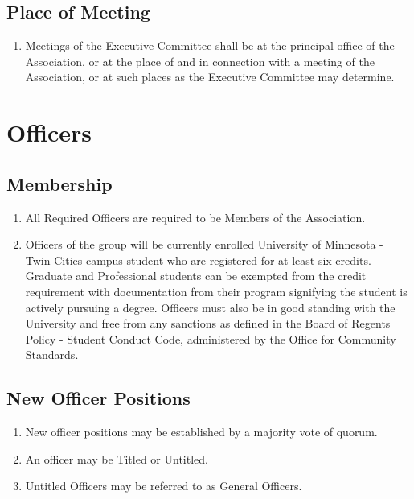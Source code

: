 \documentclass[12pt,letterpaper]{article}
\begin{document}
\subsection{Place of Meeting}
\begin{enumerate}
  \item Meetings of the Executive Committee shall be at the principal office of the
        Association, or at the place of and in connection with a meeting of the
        Association, or at such places as the Executive Committee may determine.
\end{enumerate}

\section{Officers}

\subsection{Membership}
\begin{enumerate}
  \item All Required Officers are required to be Members of the Association.
  \item Officers of the group will be currently enrolled University of Minnesota -
        Twin Cities campus student who are registered for at least six credits.
        Graduate and Professional students can be exempted from the credit
        requirement with documentation from their program signifying the student is
        actively pursuing a degree. Officers must also be in good standing with the
        University and free from any sanctions as defined in the Board of Regents
        Policy - Student Conduct Code, administered by the Office for Community
        Standards.
\end{enumerate}

\subsection{New Officer Positions}
\begin{enumerate}
  \item New officer positions may be established by a majority vote of quorum.
  \item An officer may be Titled or Untitled.
  \item Untitled Officers may be referred to as General Officers.
\end{enumerate}
\end{document}
